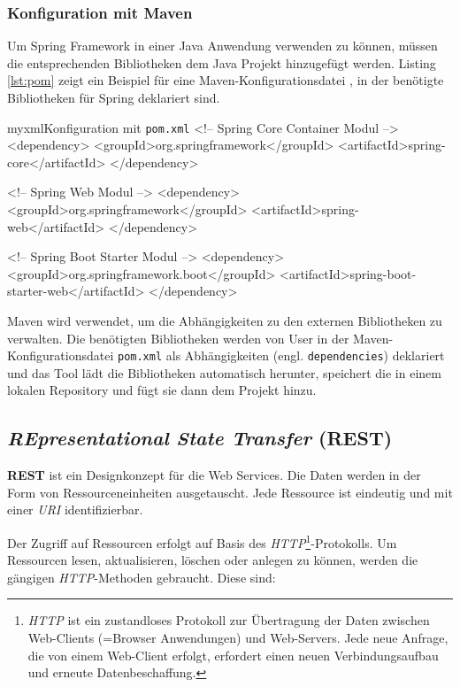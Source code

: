 \subsubsection{Konfiguration mit Maven}

Um Spring Framework in einer Java Anwendung verwenden zu können, müssen die entsprechenden Bibliotheken dem Java Projekt hinzugefügt werden. Listing \ref{lst:pom} zeigt ein Beispiel für eine Maven-Konfigurationsdatei \cite{maven}, in der benötigte Bibliotheken für Spring deklariert sind.

\begin{listingsboxJava}[label={lst:pom}]{myxml}{Konfiguration mit \texttt{pom.xml}}
	<!-- Spring Core Container Modul -->
	<dependency>
		<groupId>org.springframework</groupId>
		<artifactId>spring-core</artifactId>
	</dependency>

	<!-- Spring Web Modul -->
	<dependency>
		<groupId>org.springframework</groupId>
		<artifactId>spring-web</artifactId>
	</dependency>
	
	<!-- Spring Boot Starter Modul -->
	<dependency>
		<groupId>org.springframework.boot</groupId>
		<artifactId>spring-boot-starter-web</artifactId>
	</dependency>
\end{listingsboxJava}
Maven wird verwendet, um die Abhängigkeiten zu den externen Bibliotheken zu verwalten. Die benötigten Bibliotheken werden von User in der Maven- Konfigurationsdatei \texttt{pom.xml} als Abhängigkeiten (engl. \texttt{dependencies}) deklariert und das Tool lädt die Bibliotheken automatisch herunter, speichert die in einem lokalen Repository und fügt sie dann dem Projekt hinzu.

\subsection{\textit{\textbf{RE}presentational \textbf{S}tate \textbf{T}ransfer} (REST)}

\textbf{REST} ist ein Designkonzept für die Web Services. Die Daten werden in der Form von Ressourceneinheiten ausgetauscht. Jede Ressource ist eindeutig und mit einer \textit{URI} identifizierbar.

Der Zugriff auf Ressourcen erfolgt auf Basis des \textit{HTTP}\footnote{\textit{HTTP} ist ein zustandloses Protokoll zur Übertragung der Daten zwischen Web-Clients (=Browser Anwendungen) und Web-Servers. Jede neue Anfrage, die von einem Web-Client erfolgt, erfordert einen neuen Verbindungsaufbau und erneute Datenbeschaffung.}-Protokolls. Um Ressourcen lesen, aktualisieren, löschen oder anlegen zu können, werden die gängigen \textit{HTTP}-Methoden gebraucht. Diese sind:


